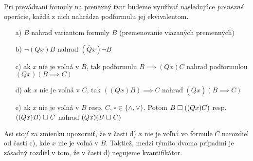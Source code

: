 Pri prevádzaní formuly na prenexný tvar budeme využívať nasledujúce
\emph{prenexné} operácie, každá z nich nahrádza podformulu
jej ekvivalentom.
\begin{itemize}
    \item[a)] $B$ nahraď variantom formuly $B$ (premenovanie viazaných
    premenných)
    \item[b)] $\neg(Q x) B$ nahraď $(\overline{Q} x) \neg B$
    \item[c)] ak $x$ nie je voľná v $B$, tak podformulu $B\implies (Qx)C$
            nahraď podformulou $(Qx) (B\implies C)$
    \item[d)] ak $x$ nie je voľná v $C$, tak $((Qx) B) \implies C$
        nahraď $(\overline{Q} x) (B \implies C)$
    \item[e)] ak $x$ nie je voľná v $B$ resp. $C$, $\square \in \{\land,\lor\}$.
     Potom $B \;\square\; ((Qx)C)$ resp. $((Qx)B)\;\square\; C$ nahraď
     $(Qx)(B \;\square\; C)$
\end{itemize}
\begin{poznamka}
    Asi stojí za zmienku upozorniť, že v časti d) $x$ nie je voľná vo
    formule $C$ narozdiel od časti c), kde $x$ nie je voľná v $B$.
    Taktiež, medzi týmito dvoma prípadmi je zásadný rozdiel v
    tom, že v časti d) negujeme kvantifikátor.
\end{poznamka}


